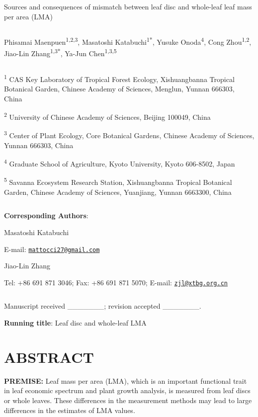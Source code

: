 \documentclass[
  12pt,
  a4paper,
,tablecaptionabove
]{scrartcl}
\date{}
\title{}
\author{}
\begin{document}




Sources and consequences of mismatch between leaf disc and whole-leaf leaf mass per area (LMA)

\[ \]

Phisamai Maenpuen\textsuperscript{1,2,3},
Masatoshi Katabuchi\textsuperscript{1*},
Yusuke Onoda\textsuperscript{4},
Cong Zhou\textsuperscript{1,2},
Jiao-Lin Zhang\textsuperscript{1,3*},
Ya-Jun Chen\textsuperscript{1,3,5}

\[ \]

\textsuperscript{1} CAS Key Laboratory of Tropical Forest Ecology, Xishuangbanna Tropical Botanical Garden, Chinese Academy of Sciences, Menglun, Yunnan 666303, China

\textsuperscript{2} University of Chinese Academy of Sciences, Beijing 100049, China

\textsuperscript{3} Center of Plant Ecology, Core Botanical Gardens, Chinese Academy of Sciences, Yunnan 666303, China

\textsuperscript{4} Graduate School of Agriculture, Kyoto University, Kyoto 606-8502, Japan

\textsuperscript{5} Savanna Ecosystem Research Station, Xishuangbanna Tropical Botanical Garden, Chinese Academy of Sciences, Yuanjiang, Yunnan 6663300, China

\[ \]

\textbf{Corresponding Authors}:

Masatoshi Katabuchi

E-mail: \href{mailto:mattocci27@gmail.com}{\nolinkurl{mattocci27@gmail.com}}

Jiao-Lin Zhang

Tel: +86 691 871 3046;
Fax: +86 691 871 5070;
E-mail: \href{mailto:zjl@xtbg.org.cn}{\nolinkurl{zjl@xtbg.org.cn}}

\[ \]

Manuscript received \_\_\_\_\_\_\_; revision accepted \_\_\_\_\_\_\_.

\textbf{Running title}: Leaf disc and whole-leaf LMA

\newpage

\hypertarget{abstract}{%
\section{ABSTRACT}\label{abstract}}

\textbf{PREMISE:}
Leaf mass per area (LMA), which is an important functional trait in leaf economic spectrum and plant growth analysis, is measured from leaf discs or whole leaves.
These differences in the measurement methods may lead to large differences in the estimates of LMA values.
\end{document}
